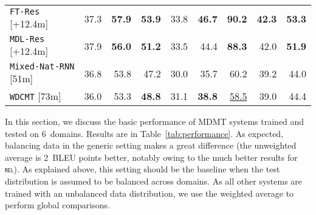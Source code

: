 \documentclass[11pt,a4paper]{article}
\newcommand{\fyTodo}[1]{\Todo[FY:]{\textcolor{orange}{#1}}}
\newcommand{\fyDone}[1]{\done[FY]\Todo[FY:]{\textcolor{orange}{#1}}}
\newcommand{\revision}[1]{#1}
\newcommand{\domain}[1]{\texttt{\textsc{#1}}}
\newcommand{\system}[1]{\texttt{{#1}}}
\newcommand{\SB}[1]{\textbf{#1}}
\newcommand{\SW}[1]{\underline{#1}}
\begin{document}
\begin{table*}
\begin{tabular}{|p{4cm}|*{8}{r|}}
    \revision{\system{FT-Res}}   \hfill{\footnotesize[+12.4m]}  & 37.3 & \SB{57.9} & \SB{53.9} & 33.8 & \SB{46.7} & \SB{90.2}  & \SB{42.3} & \SB{53.3} \\ %
    \system{MDL-Res} \hfill{\footnotesize[+12.4m]}    & 37.9 & \SB{56.0}  & \SB{51.2}   & 33.5   &  44.4  & \SB{88.3} & 42.0 & \SB{51.9} \\%
     \hline \hline
    \system{Mixed-Nat-RNN} \hfill{\footnotesize[51m]}  & 36.8 & 53.8 & 47.2 & 30.0 & 35.7 & 60.2  & 39.2  & 44.0 \\
    \hline
    \system{WDCMT}  \hfill{\footnotesize[73m]} & 36.0 & 53.3 & \SB{48.8} & 31.1 & \SB{38.8} & \SW{58.5} & 39.0 & 44.4 \\ %
    \hline
  \end{tabular}
  \caption{Translation performance of MDMT systems \revision{based on the same Transformer (top) or RNN (bottom) architecture. The former contains 65m parameters, the latter has 51m. For each system, we report the number of additional domain specific parameters,}  BLEU scores for each domain, domain-weighted (w\domain{avg}) and unweighted (\domain{avg}) averages. \revision{For weighted-averages, we take the domain proportions from Table~\ref{tab:Corpora}}. Boldface denotes significant gains with respect to \system{Mix-Nat} (or \system{Mix-Nat-RNN}, for WDCMT), underline denotes significant losses.}
  \label{tab:performance}
  \fyDone{Do we have significancy tests for averages?} %
\end{table*}

In this section, we discuss the basic performance of MDMT systems trained and tested on $6$~domains. Results are in Table~\ref{tab:performance}. As expected, balancing data in the generic setting makes a great difference (the unweighted average is 2~BLEU points\fyDone{BP?} better, notably owing to the much better results for \domain{rel}). As explained above, this setting should be the baseline when the test distribution is assumed to be balanced across domains. As all other systems are trained with an unbalanced data distribution, we use the weighted average to perform global comparisons.
\end{document}
